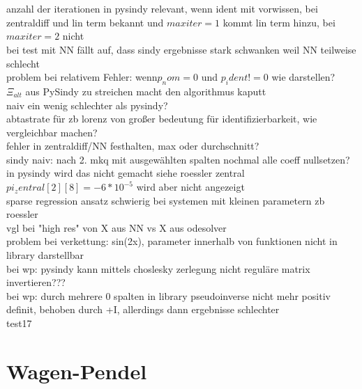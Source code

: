 \documentclass[arbeit=studie,oneside,BCOR=12mm]{ArbeitRST}
\begin{document}
\\
\\
\\
\\
\\
\\
\\

anzahl der iterationen in pysindy relevant, wenn ident mit vorwissen, bei zentraldiff und lin term bekannt und $maxiter = 1$ kommt lin term hinzu, bei $maxiter = 2$ nicht\\
bei test mit NN fällt auf, dass sindy ergebnisse stark schwanken weil NN teilweise schlecht \\
problem bei relativem Fehler: wenn$ p_nom = 0$ und $p_ident != 0$ wie darstellen?\\
$\Xi_{alt}$ aus PySindy zu streichen macht den algorithmus kaputt\\

naiv ein wenig schlechter als pysindy?\\
abtastrate für zb lorenz von großer bedeutung für identifizierbarkeit, wie vergleichbar machen?\\
fehler in zentraldiff/NN festhalten, max oder durchschnitt?\\
sindy naiv: nach 2. mkq mit ausgewählten spalten nochmal alle coeff nullsetzen? in pysindy wird das nicht gemacht siehe roessler zentral $pi_zentral[2][8] = -6*10^{-5}$ wird aber nicht angezeigt\\
sparse regression ansatz schwierig bei systemen mit kleinen parametern zb roessler\\
vgl bei "high res" von X aus NN vs X aus odesolver\\
problem bei verkettung: sin(2x), parameter innerhalb von funktionen nicht in library darstellbar\\
bei wp: pysindy kann mittels choslesky zerlegung nicht reguläre matrix invertieren???\\
bei wp: durch mehrere 0 spalten in library pseudoinverse nicht mehr positiv definit, behoben durch +I, allerdings dann ergebnisse schlechter\\
test17\\
\section{Wagen-Pendel}
\end{document}

